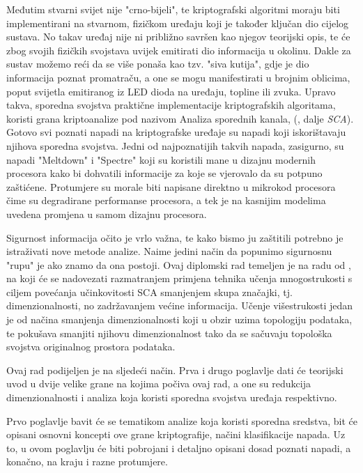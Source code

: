 \documentclass[times, utf8, diplomski]{fer}
\begin{document}
Međutim stvarni svijet nije "crno-bijeli", te kriptografski algoritmi moraju biti implementirani na stvarnom, fizičkom uređaju koji je također ključan dio cijelog sustava. No takav uređaj nije ni približno savršen kao njegov teorijski opis, te će zbog svojih fizičkih svojstava uvijek emitirati dio informacija u okolinu. Dakle za sustav možemo reći da se više ponaša kao tzv. "siva kutija", gdje je dio informacija poznat promatraču, a one se mogu manifestirati u brojnim oblicima, poput svijetla emitiranog iz LED dioda na uređaju, topline ili zvuka. Upravo takva, sporedna svojstva praktične implementacije kriptografskih algoritama, koristi grana kriptoanalize pod nazivom Analiza sporednih kanala, (, dalje \emph{SCA}). Gotovo svi poznati napadi na kriptografske uređaje su napadi koji iskorištavaju njihova sporedna svojstva. Jedni od najpoznatijih takvih napada, zasigurno, su napadi "Meltdown" \citep{Lipp2018meltdown} i "Spectre" \citep{Kocher2018spectre} koji su koristili mane u dizajnu modernih procesora kako bi dohvatili informacije za koje se vjerovalo da su potpuno zaštićene. Protumjere su morale biti napisane direktno u mikrokod procesora čime su degradirane performanse procesora, a tek je na kasnijim modelima uvedena promjena u samom dizajnu procesora.

\medskip
Sigurnost informacija očito je vrlo važna, te kako bismo ju zaštitili potrebno je istraživati nove metode analize. Naime jedini način da popunimo sigurnosnu "rupu" je ako znamo da ona postoji. Ovaj diplomski rad temeljen je na radu od \cite{8836108}, na koji će se nadovezati razmatranjem primjena tehnika učenja mnogostrukosti  s ciljem povećanja učinkovitosti SCA smanjenjem skupa značajki, tj. dimenzionalnosti, no zadržavanjem većine informacija. Učenje višestrukosti jedan je od načina smanjenja dimenzionalnosti koji u obzir uzima topologiju podataka, te pokušava smanjiti njihovu dimenzionalnost tako da se sačuvaju topološka svojstva originalnog prostora podataka.

\bigskip
Ovaj rad podijeljen je na sljedeći način. Prva i drugo poglavlje dati će teorijski uvod u dvije velike grane na kojima počiva ovaj rad, a one su redukcija dimenzionalnosti i analiza koja koristi sporedna svojstva uređaja respektivno.

Prvo poglavlje bavit će se tematikom analize koja koristi sporedna sredstva, bit će opisani osnovni koncepti ove grane kriptografije, načini klasifikacije napada. Uz to, u ovom poglavlju će biti pobrojani i detaljno opisani dosad poznati napadi, a konačno, na kraju i razne protumjere.
\end{document}
